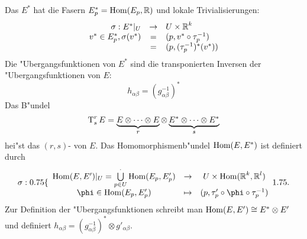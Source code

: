 Das  $E^*$ hat die Fasern $E_p^* = \operatorname{Hom}(E_p, \operatorname{\mathbb{R}})$ und lokale Trivialisierungen:
	\[ \begin{array}{rcl} \sigma: E^*|_U &\to& U \times \operatorname{\mathbb{R}}^k\\
	v^* \in E^*_p, \sigma(v^*) &=& (p, v^* \circ \tau_p^{-1}) \\
	&=& (p, (\tau_p^{-1})^*(v^*)) \end{array}\]
Die "Ubergangsfunktionen von $E^*$ sind die transponierten Inversen der "Ubergangsfunktionen von $E$:
	\[ h_{\alpha\beta} = (g_{\alpha\beta}^{-1})^* \]
Das B"undel
	\[ \operatorname{T}_s^r E = \underbrace{E \otimes \cdots \otimes E}_{r} \otimes \underbrace{E^* \otimes \cdots \otimes E^*}_{s} \]
hei"st das $(r,s)$- von $E$.
Das Homomorphismenb"undel $\operatorname{Hom}(E,E^*)$ ist definiert durch
	\[ \sigma: \left\{ \begin{array}{ccc} \Hom(E,E')|_U = \bigcup\limits_{p \in U}^{\cdot} \Hom(E_p, E_p') &\to& U \X \Hom(\R^k, \R^l)\\
		\phi \in \Hom(E_p, E'_p) &\mapsto& (p, \tau'_p \circ \phi \circ \tau_p^{-1}) \end{array} \right. \]
Zur Definition der "Ubergangsfunktionen schreibt man $\operatorname{Hom}(E, E') \cong E^* \otimes E'$ und definiert $h_{\alpha\beta} = (g_{\alpha\beta}^{-1})^* \otimes g'_{\alpha\beta}$.
\begin{center}\end{center}

